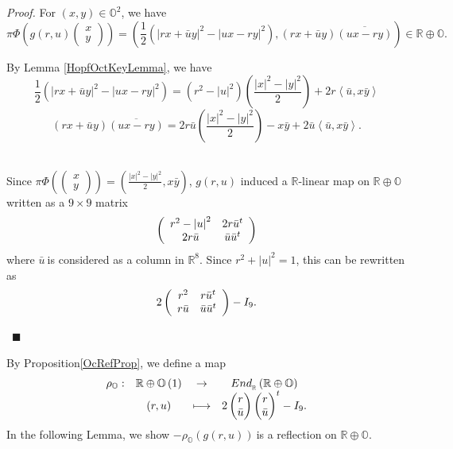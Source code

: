 \documentclass[a4paper]{article}%
\newenvironment{proof}[1][Proof]{\noindent\textit{#1.} }{}
\begin{document}
\begin{proof}
For $\left(  x,y\right)  \in\mathbb{O}^{2}$, we have
\[
\pi\Phi\left(  g\left(  r,u\right)
\begin{pmatrix}
x\\
y
\end{pmatrix}
\right)  =\left(  \frac{1}{2}\left(  \left\vert rx+\bar{u}y\right\vert
^{2}-\left\vert ux-ry\right\vert ^{2}\right)  ,\left(  rx+\bar{u}y\right)
\overline{\left(  ux-ry\right)  }\right)  \in\mathbb{R\oplus O}\text{.}%
\]


By Lemma \ref{HopfOctKeyLemma}, we have%
\[
\frac{1}{2}\left(  \left\vert rx+\bar{u}y\right\vert ^{2}-\left\vert
ux-ry\right\vert ^{2}\right)  =\left(  r^{2}-\left\vert u\right\vert
^{2}\right)  \left(  \frac{\left\vert x\right\vert ^{2}-\left\vert
y\right\vert ^{2}}{2}\right)  +2r\left\langle \bar{u},x\bar{y}\right\rangle
\]%
\[
\left(  rx+\bar{u}y\right)  \overline{\left(  ux-ry\right)  }=2r\bar{u}\left(
\frac{\left\vert x\right\vert ^{2}-\left\vert y\right\vert ^{2}}{2}\right)
-x\bar{y}+2\bar{u}\left\langle \bar{u},x\bar{y}\right\rangle .
\]
\ 

Since $\pi\Phi\left(
\begin{pmatrix}
x\\
y
\end{pmatrix}
\right)  =\left(  \frac{\left\vert x\right\vert ^{2}-\left\vert y\right\vert
^{2}}{2},x\bar{y}\right)  $, $g\left(  r,u\right)  $ induced a $\mathbb{R}%
$-linear map on $\mathbb{R\oplus O\ }$written as a $9\times9$ matrix%
\[
\left(
\begin{array}
[c]{cc}%
r^{2}-\left\vert u\right\vert ^{2} & 2r\bar{u}^{t}\\
2r\bar{u} & \bar{u}\bar{u}^{t}%
\end{array}
\right)
\]
where $\bar{u}\ $is considered as a column in $\mathbb{R}^{8}$. Since
$r^{2}+\left\vert u\right\vert ^{2}=1$, this can be rewritten as%
\[
2\left(
\begin{array}
[c]{cc}%
r^{2} & r\bar{u}^{t}\\
r\bar{u} & \bar{u}\bar{u}^{t}%
\end{array}
\right)  -I_{9}\text{.}%
\]


\ $\blacksquare$
\end{proof}

By Proposition\ref{OcRefProp}, we define a map%
\[%
\begin{array}
[c]{cccc}%
\rho_{\mathbb{O}}: & \mathbb{R\oplus O}\left(  1\right)  & \rightarrow &
End_{_{\mathbb{R}}}\left(  \mathbb{R\oplus O}\right) \\
& \left(  r,u\right)  & \longmapsto & 2%
\begin{pmatrix}
r\\
\bar{u}%
\end{pmatrix}%
\begin{pmatrix}
r\\
\bar{u}%
\end{pmatrix}
^{t}-I_{9}.
\end{array}
\]
In the following Lemma, we show $-\rho_{\mathbb{O}}\left(  g\left(
r,u\right)  \right)  \ $is a reflection on $\mathbb{R\oplus O}$.
\end{document}

